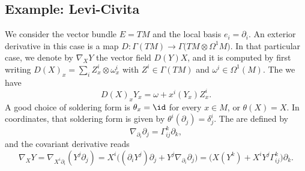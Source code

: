 \subsection{Example: Levi-Civita}

We consider the vector bundle $E=TM$ and the local basis $e_i=\partial_i$. An exterior derivative in this case is a map $D\colon \Gamma(TM)\to \Gamma\Big( TM\otimes\Omega^1M \Big)$. In that particular case, we denote by $\nabla_XY$ the vector field $D(Y)X$, and it is computed by first writing $D(X)_x=\sum_iZ_x^i\otimes\omega_x^i$ with $Z^i\in\Gamma(TM)$ and $\omega^i\in\Omega^1(M)$. The we have
\begin{equation}
D(X)_xY_x=\omega+x^i(Y_x)Z_x^i.
\end{equation}
A good choice of soldering form is $\theta_x=\id$ for every $x\in M$, or $\theta(X)=X$. In coordinates, that soldering form is given by $\theta^i(\partial_j)=\delta^i_j$. The  are defined by
\begin{equation}
\nabla_{\partial_i}\partial_j=\Gamma_{ij}^k\partial_k,
\end{equation}
and the covariant derivative reads
\begin{equation}		\label{EqCovDerGamChr}
\nabla_XY	= \nabla_{X^i\partial_i}(Y^j\partial_j)
		= X^i\Big( (\partial_iY^j)\partial_j+Y^j\nabla_{\partial_i}\partial_j \Big)
		= \Big( X(Y^k)+X^iY^j\Gamma_{ij}^k \Big) \partial_k.
\end{equation}

